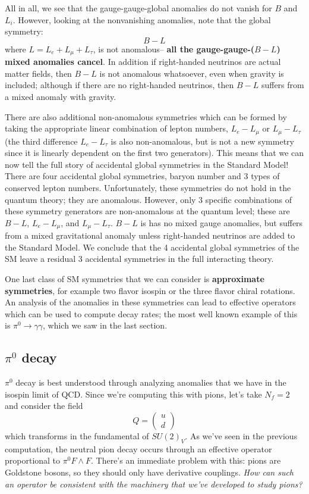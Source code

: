 \documentclass[11pt, oneside]{article}   	%
\theoremstyle{definition}
\numberwithin{equation}{subsection}		%
\begin{document}
All in all, we see that the gauge-gauge-global anomalies do not vanish for $B$ and $L_i$. However, looking at the nonvanishing anomalies, note that the global symmetry:
\begin{equation}
	B - L
\end{equation}
where $L = L_e + L_\mu + L_\tau$, is not anomalous-- \textbf{all the gauge-gauge-($B - L$) mixed anomalies cancel}. In addition if right-handed neutrinos are actual 
matter fields, then $B - L$ is not anomalous whatsoever, even when gravity is included; although if there are no right-handed neutrinos, then $B - L$ suffers from a mixed 
anomaly with gravity.

There are also additional non-anomalous symmetries which can be formed by taking the appropriate linear combination of lepton numbers, 
$L_e - L_\mu$ or $L_\mu - L_\tau$ (the third difference $L_e - L_\tau$ is also non-anomalous, but is not a new symmetry since it is linearly 
dependent on the first two generators). This means that we can now tell the full story of accidental global symmetries in the Standard Model! 
There are four accidental global symmetries, baryon number and 3 types of conserved lepton numbers. Unfortunately, these symmetries do 
not hold in the quantum theory; they are anomalous. However, only 3 specific combinations of these symmetry generators are 
non-anomalous at the quantum level; these are $B - L$, $L_e - L_\mu$, and $L_\mu - L_\tau$. $B - L$ is has no mixed gauge anomalies, 
but suffers from a mixed gravitational anomaly unless right-handed neutrinos are added to the Standard Model. We conclude that the 4 
accidental global symmetries of the SM leave a residual 3 accidental symmetries in the full interacting theory. 

One last class of SM symmetries that we can consider is \textbf{approximate symmetries}, for example two flavor isospin or the 
three flavor chiral rotations. An analysis of the anomalies in these symmetries can lead to effective operators which can be used to 
compute decay rates; the most well known example of this is $\pi^0\rightarrow\gamma\gamma$, which we saw in the last section. 

\subsection{$\pi^0$ decay}
\label{sec:pi0_decay}

$\pi^0$ decay is best understood through analyzing anomalies that we have in the isospin limit of QCD. Since we're computing 
this with pions, let's take $N_f = 2$ and consider the field
\begin{equation}
	Q = \begin{pmatrix} u \\ d \end{pmatrix}
\end{equation}
which transforms in the fundamental of $SU(2)_V$. As we've seen in the previous computation, the neutral pion decay occurs through an 
effective operator proportional to $\pi^0 F\wedge F$. There's an immediate problem with this: pions are Goldstone bosons, so they should 
only have derivative couplings. \textit{How can such an operator be consistent with the machinery that we've developed to study pions?}
\end{document}
